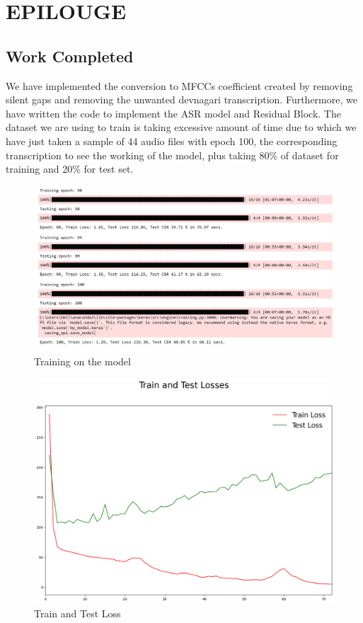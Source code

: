 \chapter{EPILOUGE}



\section{Work Completed}
We have implemented the conversion to MFCCs coefficient created by removing silent gaps and removing the unwanted devnagari transcription. Furthermore, we have written the code to implement the ASR model and Residual Block. The dataset we are using to train is taking excessive amount of time due to which we have just taken a sample of 44 audio files with epoch 100, the corresponding transcription to see the working of the model, plus taking 80\% of dataset for training and 20\% for test set.  

\begin{figure}[h]
    \centering
    \includegraphics[scale=0.4]{images/output2.png}
    \caption{ Training on the model}
    \label{fig:my_label}
\end{figure}

\newpage
\begin{figure}[h]
    \centering
    \includegraphics[scale=0.4]{images/testtrainerror.png}
    \caption{Train and Test Loss}
    \label{fig:my_label}
\end{figure}

